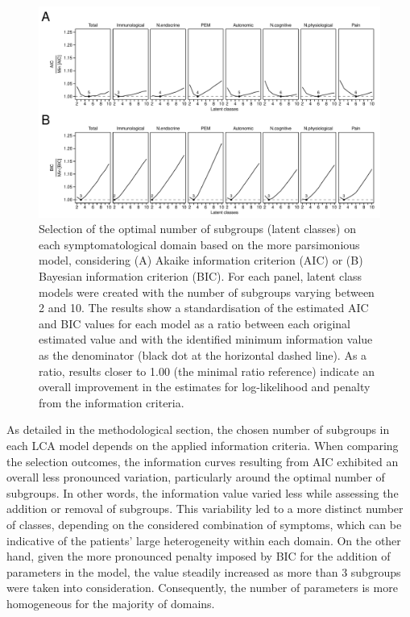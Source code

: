 \begin{figure}[h]
    \centering
    \includegraphics[width=\textwidth]{chapter/2024-sym-domains/figures/fig2-aic-bic-number-of-classes.pdf}
    \caption[Selection of the optimal number of subgroups on each symptomatological domain based on the more parsimonious model]{Selection of the optimal number of subgroups (latent classes) on each symptomatological domain based on the more parsimonious model, considering (A) Akaike information criterion (AIC) or (B) Bayesian information criterion (BIC). For each panel, latent class models were created with the number of subgroups varying between 2 and 10. The results show a standardisation of the estimated AIC and BIC values for each model as a ratio between each original estimated value and with the identified minimum information value as the denominator (black dot at the horizontal dashed line). As a ratio, results closer to 1.00 (the minimal ratio reference) indicate an overall improvement in the estimates for log-likelihood and penalty from the information criteria.}
    \label{fig:fig2-aic-bic-number-of-classes}
\end{figure}

As detailed in the methodological section, the chosen number of subgroups in each LCA model depends on the applied information criteria.
When comparing the selection outcomes, the information curves resulting from AIC exhibited an overall less pronounced variation, particularly around the optimal number of subgroups.
In other words, the information value varied less while assessing the addition or removal of subgroups.
This variability led to a more distinct number of classes, depending on the considered combination of symptoms, which can be indicative of the patients' large heterogeneity within each domain.
On the other hand, given the more pronounced penalty imposed by BIC for the addition of parameters in the model, the value steadily increased as more than 3 subgroups were taken into consideration.
Consequently, the number of parameters is more homogeneous for the majority of domains.

